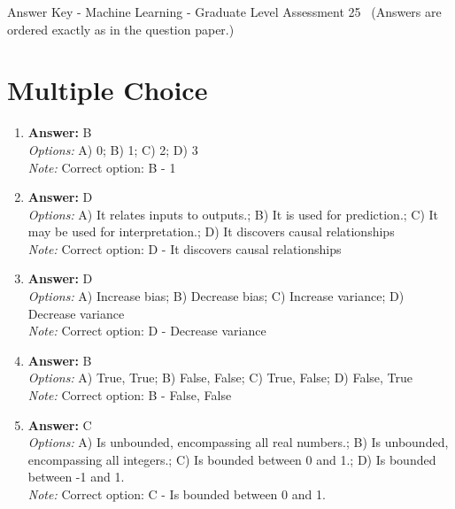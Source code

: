 \documentclass[12pt]{article}
\begin{document}
\begin{center}
Answer Key - Machine Learning - Graduate Level Assessment 25 \
\small (Answers are ordered exactly as in the question paper.)
\end{center}

\section*{Multiple Choice}
\begin{enumerate}[label=\arabic*.]
\item \textbf{Answer:} B
\\ \textit{Options:} A) 0; B) 1; C) 2; D) 3
\\ \textit{Note:} Correct option: B - 1
\item \textbf{Answer:} D
\\ \textit{Options:} A) It relates inputs to outputs.; B) It is used for prediction.; C) It may be used for interpretation.; D) It discovers causal relationships
\\ \textit{Note:} Correct option: D - It discovers causal relationships
\item \textbf{Answer:} D
\\ \textit{Options:} A) Increase bias; B) Decrease bias; C) Increase variance; D) Decrease variance
\\ \textit{Note:} Correct option: D - Decrease variance
\item \textbf{Answer:} B
\\ \textit{Options:} A) True, True; B) False, False; C) True, False; D) False, True
\\ \textit{Note:} Correct option: B - False, False
\item \textbf{Answer:} C
\\ \textit{Options:} A) Is unbounded, encompassing all real numbers.; B) Is unbounded, encompassing all integers.; C) Is bounded between 0 and 1.; D) Is bounded between -1 and 1.
\\ \textit{Note:} Correct option: C - Is bounded between 0 and 1.
\end{enumerate}
\end{document}
